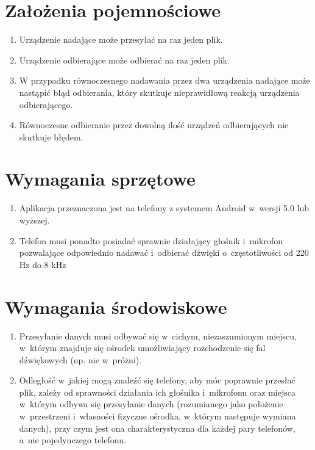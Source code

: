 \documentclass{article}
\begin{document}
\section{Założenia pojemnościowe}
    \begin{enumerate}
        \item Urządzenie nadające może przesyłać na raz jeden plik.
        \item Urządzenie odbierające może odbierać na raz jeden plik.
        \item W przypadku równoczesnego nadawania przez dwa urządzenia nadające 
              może nastąpić błąd odbierania, który skutkuje nieprawidłową reakcją
              urządzenia odbierającego.
        \item Równoczesne odbieranie przez dowolną ilość urządzeń odbierających 
              nie skutkuje błędem.
    \end{enumerate}
        
\section{Wymagania sprzętowe}
    \begin{enumerate}
        \item Aplikacja przeznaczona jest na telefony z systemem Android w~wersji
              5.0 lub wyższej.
        \item Telefon musi ponadto posiadać sprawnie działający głośnik i~mikrofon
              pozwalające odpowiednio nadawać i~odbierać dźwięki o~częstotliwości
              od 220 Hz do 8 kHz
    \end{enumerate}
        
\section{Wymagania środowiskowe}
    \begin{enumerate}
        \item Przesyłanie danych musi odbywać się w~cichym, niezaszumionym miejscu, 
              w~którym znajduje się ośrodek umożliwiający rozchodzenie się fal 
              dźwiękowych (np. nie w~próżni).
        \item Odległość w~jakiej mogą znaleźć się telefony, aby móc poprawnie 
              przesłać plik, zależy od sprawności działania ich głośnika i~mikrofonu
              oraz miejsca w~którym odbywa się przesyłanie danych (rozumianego 
              jako położenie w~przestrzeni i~własności fizyczne ośrodka, w~którym
              następuje wymiana danych), przy czym jest ona charakterystyczna 
              dla każdej pary telefonów, a~nie pojedynczego telefonu.
    \end{enumerate}
\end{document}
